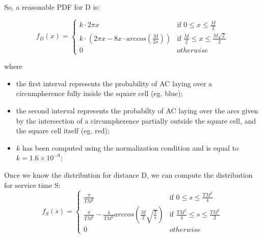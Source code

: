 \documentclass[a4paper,12pt]{article}
\begin{document}
So, a reasonable PDF for D is:

$$
f_D(x) = \begin{cases}
k \cdot 2 \pi x & \mbox{if } 0 \leq x \leq \frac{M}{2} \\
k \cdot \left( 2 \pi x - 8 x \cdot arccos \left(\frac{M}{2x}\right)\right) & \mbox{if } \frac{M}{2} \leq x \leq \frac{M \sqrt{2}}{2}\\
0 & otherwise
\end{cases}
$$

where
\begin{itemize}
  \item the first interval represents the probability of AC laying over a circumpherence fully inside the square cell (eg. blue);
  \item the second interval represents the probabilty of AC laying over the arcs given by the intersection of a circumpherence partially outside the square cell, and the square cell itself (eg. red);
  \item $k$ has been computed using the normalization condition and is equal to $k = 1.6 \times 10^{-9}$;
\end{itemize}

Once we know the distribution for distance D, we can compute the distribution for service time S:
$$
f_S(s) = \begin{cases}
\frac{\pi}{TM^2}  & \mbox{if } 0 \leq s \leq \frac{TM^2}{4} \\
\frac{\pi}{TM^2} - \frac{4}{TM^2} arccos\left( \frac{M}{2} \sqrt{\frac{T}{s}} \right) & \mbox{if } \frac{TM^2}{4} \leq s \leq \frac{TM^2}{2} \\
0 & otherwise
\end{cases}
$$
\end{document}
